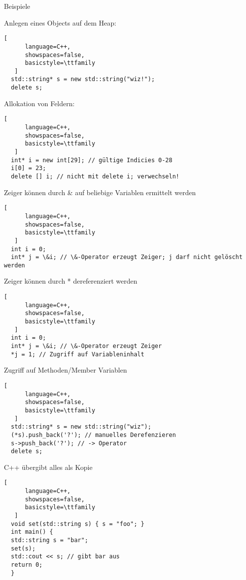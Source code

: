 \documentclass[10pt]{article}
\begin{document}
Beispiele
\begin{itemize*}
  \item Anlegen eines Objects auf dem Heap:
  \begin{lstlisting}[
      language=C++,
      showspaces=false,
      basicstyle=\ttfamily
   ]
  std::string* s = new std::string("wiz!");
  delete s;
  \end{lstlisting}
  
  \item Allokation von Feldern:
  \begin{lstlisting}[
      language=C++,
      showspaces=false,
      basicstyle=\ttfamily
   ]
  int* i = new int[29]; // gültige Indicies 0-28
  i[0] = 23;
  delete [] i; // nicht mit delete i; verwechseln!
  \end{lstlisting}
  
  \item Zeiger können durch \& auf beliebige Variablen ermittelt werden
  \begin{lstlisting}[
      language=C++,
      showspaces=false,
      basicstyle=\ttfamily
   ]
  int i = 0;
  int* j = \&i; // \&-Operator erzeugt Zeiger; j darf nicht gelöscht werden
  \end{lstlisting}
  
  \item Zeiger können durch * dereferenziert werden
  \begin{lstlisting}[
      language=C++,
      showspaces=false,
      basicstyle=\ttfamily
   ]
  int i = 0;
  int* j = \&i; // \&-Operator erzeugt Zeiger
  *j = 1; // Zugriff auf Variableninhalt
  \end{lstlisting}
  
  \item Zugriff auf Methoden/Member Variablen
  \begin{lstlisting}[
      language=C++,
      showspaces=false,
      basicstyle=\ttfamily
   ]
  std::string* s = new std::string("wiz");
  (*s).push_back('?'); // manuelles Derefenzieren
  s->push_back('?'); // -> Operator
  delete s;
  \end{lstlisting}
  
  \item C++ übergibt alles als Kopie
  \begin{lstlisting}[
      language=C++,
      showspaces=false,
      basicstyle=\ttfamily
   ]
  void set(std::string s) { s = "foo"; }
  int main() {
  std::string s = "bar";
  set(s);
  std::cout << s; // gibt bar aus
  return 0;
  }
  \end{lstlisting}
  

\end{itemize*}
\end{document}
